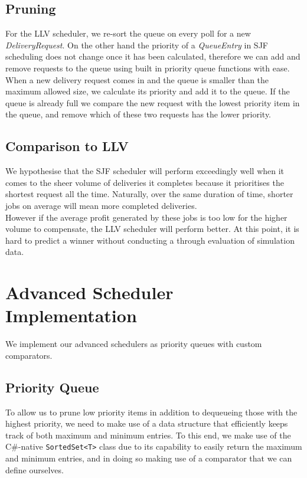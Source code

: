 \documentclass[a4paper,11pt,titlepage]{report}
\begin{document}
\subsection{Pruning}
For the LLV scheduler, we re-sort the queue on every poll for a new \textit{DeliveryRequest}. On the other hand the priority of a \textit{QueueEntry} in SJF scheduling does not change once it has been calculated, therefore we can add and remove requests to the queue using built in priority queue functions with ease.\\

When a new delivery request comes in and the queue is smaller than the maximum allowed size, we calculate its priority and add it to the queue. If the queue is already full we compare the new request with the lowest priority item in the queue, and remove which of these two requests has the lower priority.

\subsection{Comparison to LLV}
We hypothesise that the SJF scheduler will perform exceedingly well when it comes to the sheer volume of deliveries it completes because it prioritises the shortest request all the time. Naturally, over the same duration of time, shorter jobs on average will mean more completed deliveries.\\

However if the average profit generated by these jobs is too low for the higher volume to compensate, the LLV scheduler will perform better. At this point, it is hard to predict a winner without conducting a through evaluation of simulation data.

\section{Advanced Scheduler Implementation}
We implement our advanced schedulers as priority queues with custom comparators.

\subsection{Priority Queue}
To allow us to prune low priority items in addition to dequeueing those with the highest priority, we need to make use of a data structure that efficiently keeps track of both maximum and minimum entries. To this end, we make use of the C\#-native \texttt{SortedSet<T>} class \cite{Microsoft2018} due to its capability to easily return the maximum and minimum entries, and in doing so making use of a comparator that we can define ourselves.\\
\end{document}

